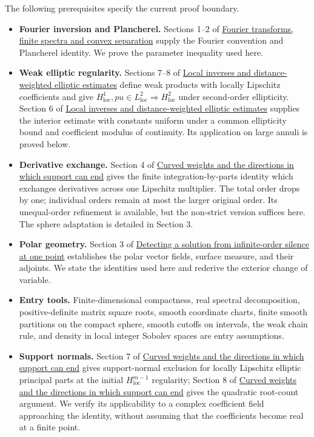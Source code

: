 \documentclass[
  11pt,
]{article}
\providecommand{\tightlist}{%
  \setlength{\itemsep}{0pt}\setlength{\parskip}{0pt}}
\begin{document}
The following prerequisites specify the current proof boundary.

\begin{itemize}
\tightlist
\item
  \textbf{Fourier inversion and Plancherel.} Sections 1--2 of
  \href{prerequisite-bridges.pdf}{Fourier transforms, finite spectra and
  convex separation} supply the Fourier convention and Plancherel
  identity. We prove the parameter inequality used here.
\item
  \textbf{Weak elliptic regularity.} Sections 7--8 of
  \href{local-elliptic-coefficients.pdf}{Local inverses and
  distance-weighted elliptic estimates} define weak products with
  locally Lipschitz coefficients and give
  \(H^1_{\mathrm{loc}},pu\in L^2_{\mathrm{loc}}\Rightarrow H^2_{\mathrm{loc}}\)
  under second-order ellipticity. Section 6 of
  \href{local-elliptic-coefficients.pdf}{Local inverses and
  distance-weighted elliptic estimates} supplies the interior estimate
  with constants uniform under a common ellipticity bound and
  coefficient modulus of continuity. Its application on large annuli is
  proved below.
\item
  \textbf{Derivative exchange.} Section 4 of
  \href{support-continuation.pdf}{Curved weights and the directions in
  which support can end} gives the finite integration-by-parts identity
  which exchanges derivatives across one Lipschitz multiplier. The total
  order drops by one; individual orders remain at most the larger
  original order. Its unequal-order refinement is available, but the
  non-strict version suffices here. The sphere adaptation is detailed in
  Section 3.
\item
  \textbf{Polar geometry.} Section 3 of
  \href{point-unique-continuation.pdf}{Detecting a solution from
  infinite-order silence at one point} establishes the polar vector
  fields, surface measure, and their adjoints. We state the identities
  used here and rederive the exterior change of variable.
\item
  \textbf{Entry tools.} Finite-dimensional compactness, real spectral
  decomposition, positive-definite matrix square roots, smooth
  coordinate charts, finite smooth partitions on the compact sphere,
  smooth cutoffs on intervals, the weak chain rule, and density in local
  integer Sobolev spaces are entry assumptions.
\item
  \textbf{Support normals.} Section 7 of
  \href{support-continuation.pdf}{Curved weights and the directions in
  which support can end} gives support-normal exclusion for locally
  Lipschitz elliptic principal parts at the initial
  \(H^{m-1}_{\mathrm{loc}}\) regularity; Section 8 of
  \href{support-continuation.pdf}{Curved weights and the directions in
  which support can end} gives the quadratic root-count argument. We
  verify its applicability to a complex coefficient field approaching
  the identity, without assuming that the coefficients become real at a
  finite point.
\end{itemize}
\end{document}
